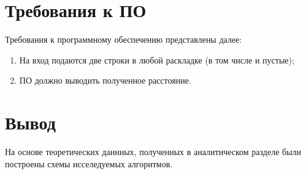 \clearpage
\section{Требования к ПО}
Требования к программному обеспечению представлены далее:
\begin{enumerate}
	\item На вход подаются две строки в любой раскладке (в том числе и пустые);
	\item ПО должно выводить полученное расстояние.
\end{enumerate}

\section{Вывод}
На основе теоретических даннных, полученных в аналитическом разделе были построены схемы исселедуемых алгоритмов.
